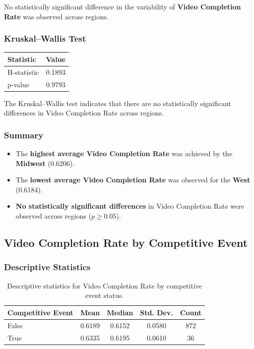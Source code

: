 No statistically significant difference in the variability of \textbf{Video Completion Rate} was observed across regions.

\vspace{0.3cm}

\subsubsection{Kruskal--Wallis Test}

\begin{table}[H]
	\centering
	\begin{tabular}{lc}
		\toprule
		Statistic & Value \\
		\midrule
		H-statistic & 0.1893 \\
		p-value & 0.9793 \\
		\bottomrule
	\end{tabular}
\end{table}

The Kruskal--Wallis test indicates that there are no statistically significant differences in Video Completion Rate across regions.

\subsubsection{Summary}

\begin{itemize}
	\item The \textbf{highest average Video Completion Rate} was achieved by the \textbf{Midwest} (0.6206).
	\item The \textbf{lowest average Video Completion Rate} was observed for the \textbf{West} (0.6184).
	\item \textbf{No statistically significant differences} in Video Completion Rate were observed across regions ($p \geq 0.05$).
\end{itemize}

\subsection{Video Completion Rate by Competitive Event}
\label{appendix:video_completion_rate_competitive_event_analysis_VCR}

\subsubsection{Descriptive Statistics}

\begin{table}[H]
	\centering
	\caption{Descriptive statistics for Video Completion Rate by competitive event status.}
	\begin{tabular}{lcccc}
		\toprule
		Competitive Event & Mean & Median & Std. Dev. & Count \\
		\midrule
		False & 0.6189 & 0.6152 & 0.0580 & 872 \\
		True & 0.6335 & 0.6195 & 0.0610 & 36 \\
		\bottomrule
	\end{tabular}
\end{table}

